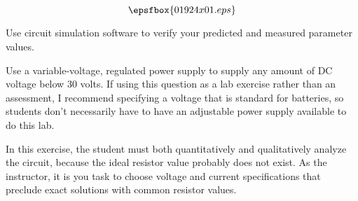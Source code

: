 

$$\epsfbox{01924x01.eps}$$

\vfil \eject






Use circuit simulation software to verify your predicted and measured parameter values.







Use a variable-voltage, regulated power supply to supply any amount of DC voltage below 30 volts.  If using this question as a lab exercise rather than an assessment, I recommend specifying a voltage that is standard for batteries, so students don't necessarily have to have an adjustable power supply available to do this lab.

In this exercise, the student must both quantitatively and qualitatively analyze the circuit, because the ideal resistor value probably does not exist.  As the instructor, it is you task to choose voltage and current specifications that preclude exact solutions with common resistor values.




